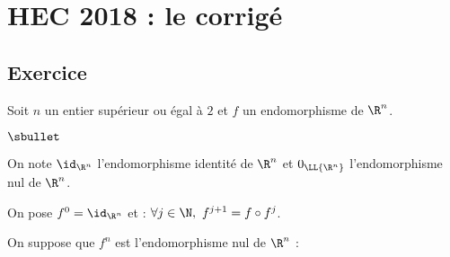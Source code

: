 \chapter*{HEC 2018 : le corrigé}
  
%

\section*{Exercice}

\noindent
Soit $n$ un entier supérieur ou égal à $2$ et $f$ un endomorphisme de
$\R^n$.
\begin{noliste}{$\sbullet$}
\item On note $\id_{\R^n}$ l'endomorphisme identité de $\R^n$ et
  $0_{\LL{\R^n}}$ l'endomorphisme nul de $\R^n$.

\item On pose $f^0=\id_{\R^n}$ et : $\forall j \in \N, \ f^{j+1}=f
  \circ f^j$.
  
\item On suppose que $f^n$ est l'endomorphisme nul de $\R^n$ : \
\end{noliste}

